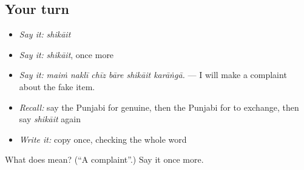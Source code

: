 \subsection*{Your turn}
\begin{itemize}
\raggedright
  \item \emph{Say it:} \emph{shikāit}
  \item \emph{Say it:} \emph{shikāit}, once more
  \item \emph{Say it:} \emph{maiṁ naklī chīz bāre shikāit karāṅgā.} — I will make a complaint about the fake item.
  \item \emph{Recall:} say the Punjabi for genuine, then the Punjabi for to exchange, then say \emph{shikāit} again
  \item \emph{Write it:} copy \textbf{} once, checking the whole word
\end{itemize}

\begin{tcolorbox}[breakable,colback=teal!4,colframe=teal!35!black,title={Before you move on}]
What does  mean? (\textquotedblleft{}A complaint\textquotedblright{}.) Say it once more.
\end{tcolorbox}
